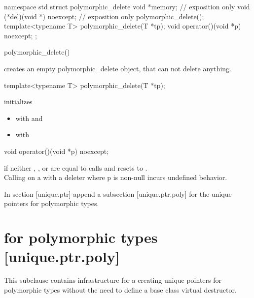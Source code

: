 \documentclass[ebook,11pt,article]{memoir}
\begin{document}
\begin{codeblock}
namespace std{
struct polymorphic_delete{
	void *memory; // exposition only
	void (*del)(void *) noexcept; // exposition only
	polymorphic_delete();
	template<typename T>
	polymorphic_delete(T *tp);
	void operator()(void *p) noexcept;
};
}
\end{codeblock}

\begin{itemdecl}
polymorphic_delete()
\end{itemdecl}

\pnum
\effects creates an empty polymorphic_delete object, that can not delete anything.
\\

\begin{itemdecl}
template<typename T>
polymorphic_delete(T *tp);
\end{itemdecl}

\pnum
\effects initializes 
\begin{itemize}
\item {} with  and 
\item {} with   
\end{itemize}


\begin{itemdecl}
void operator()(void *p) noexcept;
\end{itemdecl}

\pnum
\effects if neither , , or  are equal to  calls  and resets  to .
\\
\pnum
\enternote
Calling  on a  with a  deleter where p is non-null incurs undefined behavior.
\exitnote

In section [unique.ptr] append a subsection [unique.ptr.poly] for the unique pointers for polymorphic types.

\section{ for polymorphic types [unique.ptr.poly]}
\pnum
This subclause contains infrastructure for a creating unique pointers for polymorphic types without the need to define a base class virtual destructor.\\
\end{document}

